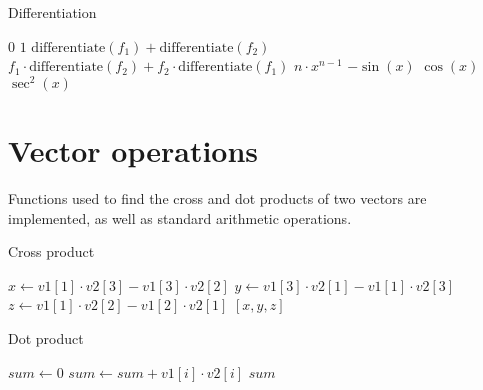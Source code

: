 \begin{algorithm}
    \caption{Differentiation}
    \begin{algorithmic}
            \State \Return $0$
            \State \Return $1$
            \State \Return $\text{differentiate}(f_1) + \text{differentiate}(f_2)$
            \State \Return $f_1 \cdot \text{differentiate}(f_2) + f_2 \cdot \text{differentiate}(f_1)$
            \State \Return $n \cdot x^{n-1}$
            \State \Return $-\sin(x)$
            \State \Return $\cos(x)$
            \State \Return $\sec^2(x)$
        \EndIf

        \EndFunction
    \end{algorithmic}\label{alg:algorithm4}
\end{algorithm}

\section{Vector operations}\label{sec:vector-ops}

Functions used to find the cross and dot products of two vectors are implemented, as well as standard arithmetic
operations.

\begin{algorithm}
    \caption{Cross product}
    \begin{algorithmic}
            \State $x \gets v1[1] \cdot v2[3] - v1[3] \cdot v2[2]$
            \State $y \gets v1[3] \cdot v2[1] - v1[1] \cdot v2[3]$
            \State $z \gets v1[1] \cdot v2[2] - v1[2] \cdot v2[1]$
            \State \Return $[x, y, z]$
        \EndFunction
    \end{algorithmic}\label{alg:algorithm6}
\end{algorithm}

\begin{algorithm}
    \caption{Dot product}
    \begin{algorithmic}
            \State $sum \gets 0$
                \State $sum \gets sum + v1[i] \cdot v2[i]$
            \EndFor
            \State \Return $sum$
        \EndFunction
    \end{algorithmic}\label{alg:algorithm7}
\end{algorithm}

